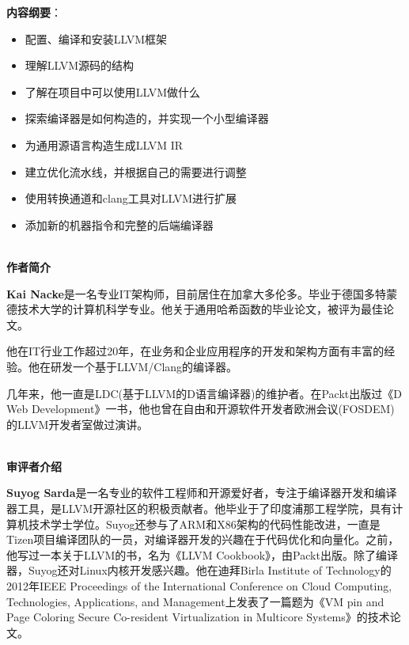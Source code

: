 \documentclass[11pt,a4paper,UTF8]{ctexart}
\begin{document}
	\textbf{内容纲要}：\par
	
	\begin{itemize}
		\item 配置、编译和安装LLVM框架
		\item 理解LLVM源码的结构
		\item 了解在项目中可以使用LLVM做什么
		\item 探索编译器是如何构造的，并实现一个小型编译器
		\item 为通用源语言构造生成LLVM IR
		\item 建立优化流水线，并根据自己的需要进行调整
		\item 使用转换通道和clang工具对LLVM进行扩展
		\item 添加新的机器指令和完整的后端编译器
	\end{itemize}
	
	
	\hspace*{\fill} \\ %
	\noindent\textbf{作者简介}\ \par
	
	\textbf{Kai Nacke}是一名专业IT架构师，目前居住在加拿大多伦多。毕业于德国多特蒙德技术大学的计算机科学专业。他关于通用哈希函数的毕业论文，被评为最佳论文。\par
	
	他在IT行业工作超过20年，在业务和企业应用程序的开发和架构方面有丰富的经验。他在研发一个基于LLVM/Clang的编译器。\par
	
	几年来，他一直是LDC(基于LLVM的D语言编译器)的维护者。在Packt出版过《D Web Development》一书，他也曾在自由和开源软件开发者欧洲会议(FOSDEM)的LLVM开发者室做过演讲。\par
	
	\hspace*{\fill} \\ %
	\noindent\textbf{审评者介绍}\ \par
	
	\textbf{Suyog Sarda}是一名专业的软件工程师和开源爱好者，专注于编译器开发和编译器工具，是LLVM开源社区的积极贡献者。他毕业于了印度浦那工程学院，具有计算机技术学士学位。Suyog还参与了ARM和X86架构的代码性能改进，一直是Tizen项目编译团队的一员，对编译器开发的兴趣在于代码优化和向量化。之前，他写过一本关于LLVM的书，名为《LLVM Cookbook》，由Packt出版。除了编译器，Suyog还对Linux内核开发感兴趣。他在迪拜Birla Institute of Technology的2012年IEEE Proceedings of the International Conference on Cloud Computing, Technologies, Applications, and Management上发表了一篇题为《VM pin and Page Coloring Secure Co-resident Virtualization in Multicore Systems》的技术论文。
\end{document}
